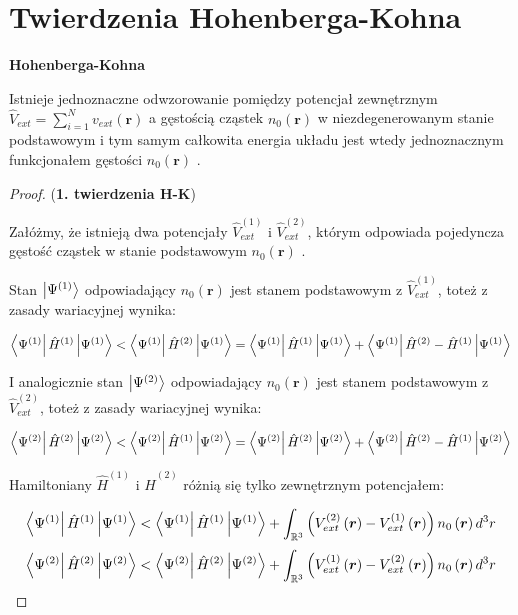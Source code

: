 
\section{Twierdzenia Hohenberga-Kohna}
\begin{thm}
\textbf{Hohenberga-Kohna}

Istnieje jednoznaczne odwzorowanie pomiędzy potencjał zewnętrznym
$\hat{V}_{ext}=\sum_{i=1}^{N}v_{ext}(\boldsymbol{r})$ a gęstością
cząstek $n_{0}\left(\boldsymbol{r}\right)$ w niezdegenerowanym stanie
podstawowym i tym samym całkowita energia układu jest wtedy jednoznacznym
funkcjonałem gęstości $n_{0}\left(\boldsymbol{r}\right)$ . \end{thm}
\begin{proof}
(\textbf{1. twierdzenia H-K})

Załóżmy, że istnieją dwa potencjały $\hat{V}_{ext}^{(1)}$ i $\hat{V}_{ext}^{(2)}$,
którym odpowiada pojedyncza gęstość cząstek w stanie podstawowym $n_{0}\left(\boldsymbol{r}\right)$
.

Stan $\ket{\Psi^{(1)}}$ odpowiadający $n_{0}\left(\boldsymbol{r}\right)$
jest stanem podstawowym z $\hat{V}_{ext}^{(1)}$, toteż z zasady wariacyjnej
wynika:

\[
\bra{\Psi^{(1)}}\hat{H}^{(1)}\ket{\Psi^{(1)}}<\bra{\Psi^{(1)}}\hat{H}^{(2)}\ket{\Psi^{(1)}}=\bra{\Psi^{(1)}}\hat{H}^{(1)}\ket{\Psi^{(1)}}+\bra{\Psi^{(1)}}\hat{H}^{(2)}-\hat{H}^{(1)}\ket{\Psi^{(1)}}
\]


I analogicznie stan $\ket{\Psi^{(2)}}$ odpowiadający $n_{0}\left(\boldsymbol{r}\right)$
jest stanem podstawowym z $\hat{V}_{ext}^{(2)}$, toteż z zasady wariacyjnej
wynika:

\[
\bra{\Psi^{(2)}}\hat{H}^{(2)}\ket{\Psi^{(2)}}<\bra{\Psi^{(2)}}\hat{H}^{(1)}\ket{\Psi^{(2)}}=\bra{\Psi^{(2)}}\hat{H}^{(2)}\ket{\Psi^{(2)}}+\bra{\Psi^{(2)}}\hat{H}^{(2)}-\hat{H}^{(1)}\ket{\Psi^{(2)}}
\]


Hamiltoniany $\hat{H}^{(1)}$ i $\hat{H}^{(2)}$ różnią się tylko
zewnętrznym potencjałem:

\[
\bra{\Psi^{(1)}}\hat{H}^{(1)}\ket{\Psi^{(1)}}<\bra{\Psi^{(1)}}\hat{H}^{(1)}\ket{\Psi^{(1)}}+\int_{\mathbb{R}^{3}}\left(V_{ext}^{(2)}\left(\boldsymbol{r}\right)-V_{ext}^{(1)}\left(\boldsymbol{r}\right)\right)n_{0}\left(\boldsymbol{r}\right)d^{3}r
\]
\[
\bra{\Psi^{(2)}}\hat{H}^{(2)}\ket{\Psi^{(2)}}<\bra{\Psi^{(2)}}\hat{H}^{(2)}\ket{\Psi^{(2)}}+\int_{\mathbb{R}^{3}}\left(V_{ext}^{(1)}\left(\boldsymbol{r}\right)-V_{ext}^{(2)}\left(\boldsymbol{r}\right)\right)n_{0}\left(\boldsymbol{r}\right)d^{3}r
\]



\end{proof}
